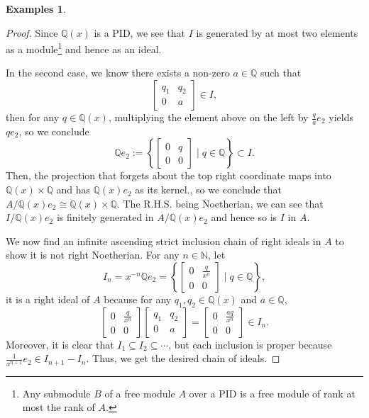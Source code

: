 \documentclass{tufte-handout} %
\theoremstyle{definition}
\newtheorem{exmps}[thm]{Examples}
\theoremstyle{remark}
\newcommand{\N}{\mathbb{N}}
\newcommand{\Q}{\mathbb{Q}}
\begin{document}
\begin{exmps}
\begin{enumerate}
\begin{proof}
			Since $\Q(x)$ is a PID, we see that $I$ is generated by at most two elements as a module\footnote{Any submodule $B$ of a free module $A$ over a PID is a free module of rank at most the rank of $A$.} and hence as an ideal. 
			
			In the second case, we know there exists a non-zero $a \in \Q$ such that 
			\[\begin{bmatrix}q_1&q_2\\0&a\end{bmatrix} \in I,\]
			then for any $q \in \Q(x)$, multiplying the element above on the left by $\frac{q}{a}e_2$ yields $qe_2$, so we conclude
			\[\Q e_2 := \left\{\begin{bmatrix}0&q\\0&0\end{bmatrix}\mid q \in \Q \right\} \subset I.\]
			Then, the projection that forgets about the top right coordinate maps into $\Q(x) \times \Q$ and has $\Q(x)e_2$ as its kernel., so we conclude that $A/\Q(x)e_2 \cong \Q(x) \times \Q$. The R.H.S. being Noetherian, we can see that $I/\Q(x)e_2$ is finitely generated in $A/\Q(x)e_2$ and hence so is $I$ in $A$.
			
			We now find an infinite ascending strict inclusion chain of right ideals in $A$ to show it is not right Noetherian. For any $n \in \N$, let
			\[I_n = x^{-n}\Q e_2 = \left\{\begin{bmatrix}0&\frac{q}{x^n}\\0&0\end{bmatrix}\mid q \in \Q \right\},\]
			it is a right ideal of $A$ because for any $q_1,q_2 \in \Q(x)$ and $a \in \Q$,
			\[\begin{bmatrix}0&\frac{q}{x^n}\\0&0\end{bmatrix}\begin{bmatrix}q_1&q_2\\0&a\end{bmatrix} = \begin{bmatrix}0&\frac{aq}{x^n}\\0&0\end{bmatrix} \in I_n.\]
			Moreover, it is clear that $I_1 \subseteq I_2 \subseteq \cdots$, but each inclusion is proper because $\frac{1}{x^{n+1}} e_2 \in I_{n+1} - I_{n}$. Thus, we get the desired chain of ideals.
		\end{proof}
	\end{enumerate}
	
\end{exmps}
\end{document}
